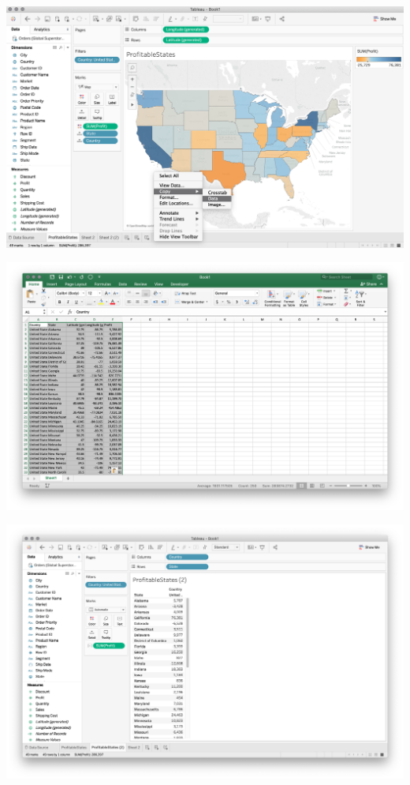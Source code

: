 \documentclass[xcolor=svgnames]{beamer} %
\begin{document}
\begin{frame}
\begin{center}
\includegraphics[width=.9\textwidth]{img/copy}
\end{center}
\end{frame}

\begin{frame}
\begin{center}
\includegraphics[width=.9\textwidth]{img/paste}
\end{center}
\end{frame}

\begin{frame}
\begin{center}
\includegraphics[width=.9\textwidth]{img/crosstab2}
\end{center}
\end{frame}
\end{document}
